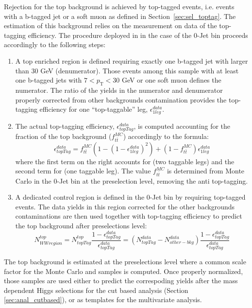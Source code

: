 Rejection for the top background is achieved by top-tagged events, i.e. events with a b-tagged jet
or a soft muon as defined in Section~\ref{sec:sel_toptag}. 
The estimation of this background relies on the measurement on data of the top-tagging efficiency.
The procedure deployed in \cite{HWW2011} in the case of the 0-Jet bin proceeds accordingly to the following steps:
\begin{enumerate}
\item A top enriched region is defined requiring exactly one b-tagged jet with \pt larger than $30$ GeV (denumerator). 
Those events among this sample with at least one b-tagged jets with $7<\ensuremath{p_\mathrm{T}}<30$ GeV 
or one soft muon defines the numerator. The ratio of the yields in the numerator and denumerator properly corrected
from other backgrounds contamination provides the top-tagging efficiency 
for one ``top-taggable'' leg, $\epsilon_{1leg}^{data}$. 
\item The actual top-tagging efficiency, $\epsilon_{topTag}^{data}$, is computed accounting for 
the \ttbar fraction of the top background ($f_{t\bar{t}}^{MC}$) accordingly to the formula:
\begin{equation} \label{eq:oldTopTagEff}
\epsilon_{topTag}^{data} = f_{t\bar{t}}^{MC}(1-(1-\epsilon_{1leg}^{data})^2) + (1-f_{t\bar{t}}^{MC})\epsilon_{1leg}^{data}
\end{equation} 
where the first term on the right accounts for \ttbar (two taggable legs) and the second term for \tw 
(one taggable leg). The value $f_{t\bar{t}}^{MC}$ is determined from Monte Carlo in the 0-Jet bin 
at the \WW preselection level, removing the anti top-tagging.
\item A dedicated control region is defined in the 0-Jet bin by requiring top-tagged events. 
The data yields in this region corrected for the other backgrounds contaminations are then used
together with top-tagging efficiency to predict the top background after \WW preselections level:
\begin{equation} \label{eq:topExtrapolation}
N^{top}_{WW region}=N_{topTag}^{top}\frac{1-\epsilon_{topTag}^{data}}{\epsilon_{topTag}^{data}} = 
(N_{topTag}^{data}-N_{other-bkg}^{data})\frac{1-\epsilon_{topTag}^{data}}{\epsilon_{topTag}^{data}}
\end{equation} 
\end{enumerate} 

The top background is estimated at the \WW preselections level where a common scale factor 
for the Monte Carlo \ttbar and \tw samples is computed. 
Once properly normalized, those samples are used either to predict
the correspoding yields after the mass dependent Higgs selections for the cut based analysis 
(Section \ref{sec:anal_cutbased}), or as templates for the multivariate analysis.


